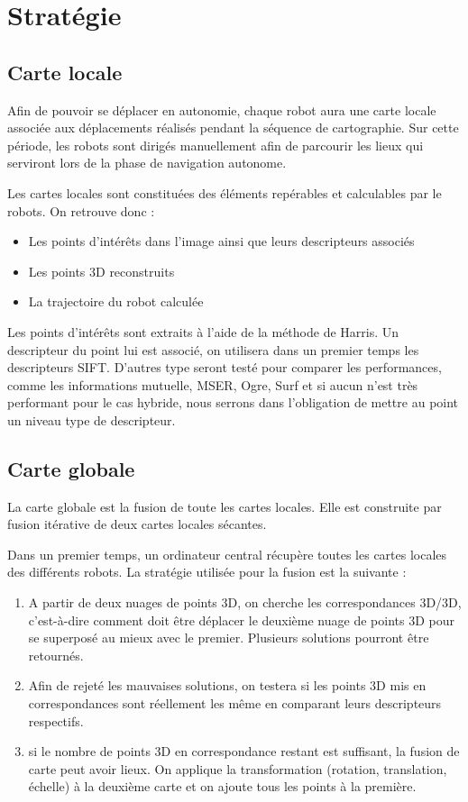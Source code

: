 \section{Stratégie}
\label{sec:strategie}

\subsection{Carte locale}

Afin de pouvoir se déplacer en autonomie, chaque robot aura une carte locale associée aux déplacements réalisés pendant la séquence de cartographie.
Sur cette période, les robots sont dirigés manuellement afin de parcourir les lieux qui serviront lors de la phase de navigation autonome.

Les cartes locales sont constituées des éléments repérables et calculables par le robots.
On retrouve donc :
\begin{itemize}
\item Les points d'intérêts dans l'image ainsi que leurs descripteurs associés
\item Les points 3D reconstruits
\item La trajectoire du robot calculée
\end{itemize}

Les points d'intérêts sont extraits à l'aide de la méthode de Harris.
Un descripteur du point lui est associé, on utilisera dans un premier temps les descripteurs SIFT.
D'autres type  seront testé pour comparer les performances, comme les informations mutuelle, MSER, Ogre, Surf et si aucun n'est très performant pour le cas hybride, nous serrons dans l'obligation de mettre au point un niveau type de descripteur.


\subsection{Carte globale}

La carte globale est la fusion de toute les cartes locales.
Elle est construite par fusion itérative de deux cartes locales sécantes.

Dans un premier temps, un ordinateur central récupère toutes les cartes locales des différents robots.
La stratégie utilisée pour la fusion est la suivante :
\begin{enumerate}
\item A partir de deux nuages de points 3D, on cherche les correspondances 3D/3D, c'est-à-dire comment doit être déplacer le deuxième nuage de points 3D pour se superposé au mieux avec le premier.
Plusieurs solutions pourront être retournés.
\item Afin de rejeté les mauvaises solutions, on testera si les points 3D mis en correspondances sont réellement les même en comparant leurs descripteurs respectifs.
\item si le nombre de points 3D en correspondance restant est suffisant, la fusion de carte peut avoir lieux.
On applique la transformation (rotation, translation, échelle) à la deuxième carte et on ajoute tous les points à la première.
\end{enumerate}

